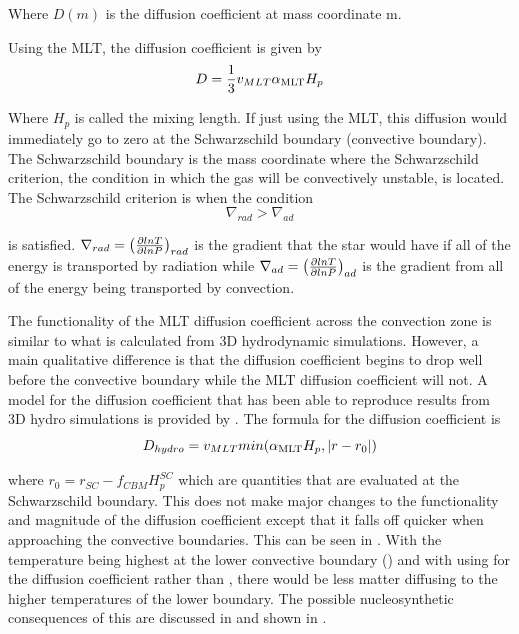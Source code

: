 \documentclass[fleqn,usenatbib]{mnras}
\begin{document}
\noindent Where $D(m)$ is the diffusion coefficient at mass coordinate m. 

Using the MLT, the diffusion coefficient is given by
\begin{equation}
D = \frac{1}{3} v_{MLT} \alpha_{\mathrm{MLT}} H_{p}
\label{eq:diffusion_mlt}
\end{equation}

\noindent Where \alphaMLT$H_{p}$ is called the mixing length. If just using the MLT, this diffusion would immediately go to zero at the Schwarzschild boundary (convective boundary). The Schwarzschild boundary is the mass coordinate where the Schwarzschild criterion, the condition in which the gas will be convectively unstable, is located. The Schwarzschild criterion is when the condition
\begin{equation}
\nabla_{rad} > \nabla_{ad}
\end{equation}

\noindent is satisfied. $\nabla_{rad} = \left({\frac{\partial{lnT}}{\partial{lnP}}}\right)_{rad}$ is the gradient that the star would have if all of the energy is transported by radiation while $\nabla_{ad} = \left({\frac{\partial{lnT}}{\partial{lnP}}}\right)_{ad}$ is the gradient from all of the energy being transported by convection. 

The functionality of the MLT diffusion coefficient across the convection zone is similar to what is calculated from 3D hydrodynamic simulations. However, a main qualitative difference is that the diffusion coefficient begins to drop well before the convective boundary while the MLT diffusion coefficient will not. A model for the diffusion coefficient that has been able to reproduce results from 3D hydro simulations is provided by \citep{4pi}. The formula for the diffusion coefficient is  
\begin{equation}
D_{hydro} = v_{MLT}min(\alpha_{\mathrm{MLT}} H_{p}, |r - r_{0}|)
\label{eq:Jones}
\end{equation} 

\noindent where $r_{0} = r_{SC} - f_{CBM}H_{p}^{SC}$ which are quantities that are evaluated at the Schwarzschild boundary. This does not make major changes to the functionality and magnitude of the diffusion coefficient except that it falls off quicker when approaching the convective boundaries. This can be seen in . With the temperature being highest at the lower convective boundary () and with using  for the diffusion coefficient rather than , there would be less matter diffusing to the higher temperatures of the lower boundary. The possible nucleosynthetic consequences of this are discussed in  and shown in .
\end{document}
